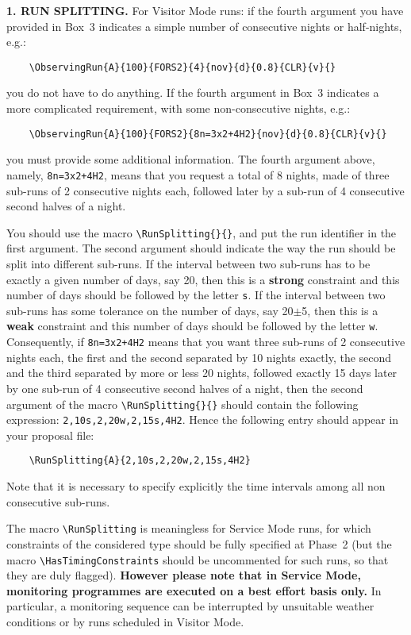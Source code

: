 \documentclass{article}
\begin{document}
{\bf 1. RUN SPLITTING.} For Visitor Mode runs: if the fourth argument
you have provided in 
Box~3 indicates a simple number of consecutive nights or half-nights,
e.g.:
\begin{verbatim}
    \ObservingRun{A}{100}{FORS2}{4}{nov}{d}{0.8}{CLR}{v}{}
\end{verbatim}
you do not have to do anything.  If the fourth argument in Box~3
indicates a more complicated requirement, with some non-consecutive
nights, e.g.: 
\begin{verbatim}
    \ObservingRun{A}{100}{FORS2}{8n=3x2+4H2}{nov}{d}{0.8}{CLR}{v}{}
\end{verbatim}
you must provide some additional information.  The fourth argument above,
namely, \verb|8n=3x2+4H2|, means that you request a total of 8 nights,
made of three sub-runs of 2 consecutive nights each, followed later by
a sub-run of 4 consecutive second halves of a night.

You should use the macro \verb|\RunSplitting{}{}|, and put
the run identifier in the first argument.  The second argument should indicate
the way the run should be split into different sub-runs.  If the
interval between two sub-runs has to be exactly a given number of
days, say 20, then this is a {\bf strong} constraint and this number
of days should be followed by the letter \verb|s|.  If the interval
between two sub-runs has some tolerance on the number of days, say
20$\pm$5, then this is a {\bf weak} constraint and this number of days
should be followed by the letter \verb|w|.  Consequently, if
\verb|8n=3x2+4H2| means that you want three sub-runs of 2 consecutive
nights each, the first and the second separated by 10 nights exactly,
the second and the third separated by more or less 20 nights, followed
exactly 15 days later by one sub-run of 4 consecutive second halves of
a night, then the second argument of the macro
\verb|\RunSplitting{}{}| should contain the following expression:
\verb|2,10s,2,20w,2,15s,4H2|. Hence the following entry should appear
in your proposal file:
\begin{verbatim}
    \RunSplitting{A}{2,10s,2,20w,2,15s,4H2}
\end{verbatim}

Note that it is necessary to specify explicitly the time intervals
among all non consecutive sub-runs.

The macro \verb|\RunSplitting| is meaningless for Service Mode runs,
for which constraints of the considered type should be fully specified
at Phase~2 (but the macro \verb|\HasTimingConstraints| should be
uncommented for such runs, so that they are duly flagged). {\bf
  However please note that in Service Mode, 
  monitoring programmes are executed on a best effort 
  basis only.} In particular, a monitoring sequence can be interrupted
by unsuitable weather conditions or by runs scheduled in Visitor Mode.
\end{document}
